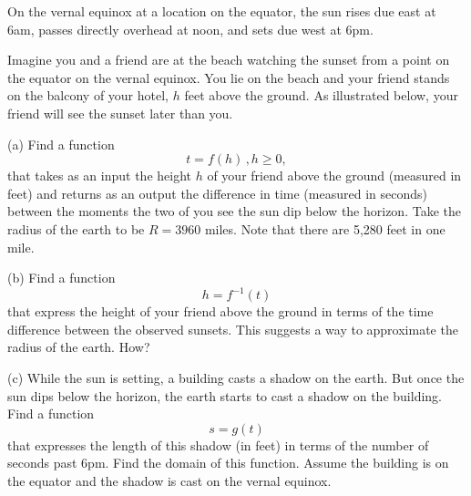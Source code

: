 \documentclass{ximera}
\begin{document}
\begin{question} \label{Q6:RightTriangle}
On the vernal equinox at a location on the equator, the sun rises due east at 6am, passes directly overhead at noon, and sets due west at 6pm. 

Imagine you and a friend are at the beach watching the sunset from a point on the equator on the vernal equinox. You lie on the beach and your friend stands on the balcony of your hotel, $h$ feet above the ground. As illustrated below, your friend will see the sunset later than you. 

(a) Find a function
\[
   t = f(h) \, , h\geq 0 ,
\]
that takes as an input the height $h$ of your friend above the ground (measured in feet) and returns as an output the difference in time (measured in seconds) between the moments the two of you see the sun dip below the horizon. Take the radius of the earth to be $R=3960$ miles. Note that there are 5,280 feet in one mile.

(b) Find a function 
\[
   h = f^{-1}(t)
\]
that express the height of your friend above the ground in terms of the time difference between the observed sunsets. This suggests a way to approximate the radius of the earth. How?

(c) While the sun is setting, a building casts a shadow on the earth. But once the sun dips below the horizon, the earth starts to cast a shadow on the building. Find a function
\[
  s = g(t) 
\]
that expresses the length of this shadow (in feet) in terms of the number of seconds past 6pm. Find the domain of this function. Assume the building is on the equator and the shadow is cast on the vernal equinox.
\begin{exploration}

 
\begin{onlineOnly}
    \begin{center}
\end{center}
\end{onlineOnly}
\end{exploration}


\end{question}
\end{document}
